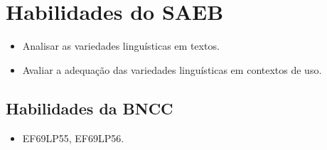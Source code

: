 \section{Habilidades do SAEB} 

\begin{itemize}
\item Analisar as variedades linguísticas em
textos.
\item Avaliar a adequação das variedades linguísticas em contextos
de uso.
\end{itemize}

\subsection{Habilidades da BNCC}

\begin{itemize}
\tightlist
\item
  EF69LP55, EF69LP56.
\end{itemize}

